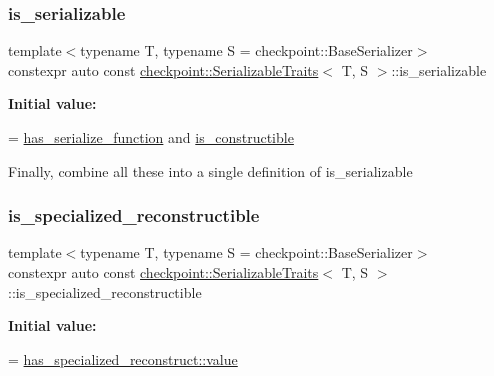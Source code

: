 \subsubsection{\texorpdfstring{is\+\_\+serializable}{is\_serializable}}
{\footnotesize\ttfamily template$<$typename T, typename S = checkpoint\+::\+Base\+Serializer$>$ \\
constexpr auto const \hyperlink{structcheckpoint_1_1_serializable_traits}{checkpoint\+::\+Serializable\+Traits}$<$ T, S $>$\+::is\+\_\+serializable\hspace{0.3cm}{\ttfamily [static]}}

{\bfseries Initial value\+:}
\begin{DoxyCode}
=
    \hyperlink{structcheckpoint_1_1_serializable_traits_a4d17a7627a8e033cccb5cf4e6b8fd0dc}{has\_serialize\_function} and \hyperlink{structcheckpoint_1_1_serializable_traits_a7720e2f57d1b3d2f87fd022b47d0b775}{is\_constructible}
\end{DoxyCode}
Finally, combine all these into a single definition of is\+\_\+serializable \mbox{\label{structcheckpoint_1_1_serializable_traits_a305317a4e8fb44498f195a39bf59ad2d}} 
\subsubsection{\texorpdfstring{is\+\_\+specialized\+\_\+reconstructible}{is\_specialized\_reconstructible}}
{\footnotesize\ttfamily template$<$typename T, typename S = checkpoint\+::\+Base\+Serializer$>$ \\
constexpr auto const \hyperlink{structcheckpoint_1_1_serializable_traits}{checkpoint\+::\+Serializable\+Traits}$<$ T, S $>$\+::is\+\_\+specialized\+\_\+reconstructible\hspace{0.3cm}{\ttfamily [static]}}

{\bfseries Initial value\+:}
\begin{DoxyCode}
=
    \hyperlink{structdetection_1_1detector_a6d7d0e1bdf5903db9edbe448edccf83b}{has\_specialized\_reconstruct::value}
\end{DoxyCode}
\mbox{\label{structcheckpoint_1_1_serializable_traits_aa6618d9f36e37127006112c73755fceb}} 

